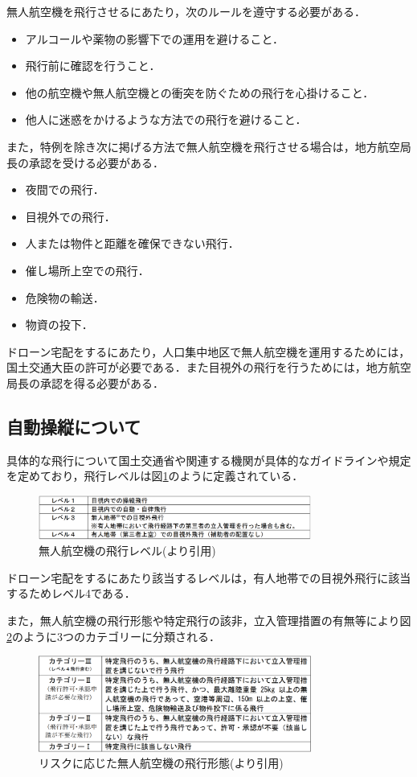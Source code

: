 \documentclass[a4paper, titlepage]{jsarticle}
\begin{document}
無人航空機を飛行させるにあたり，次のルールを遵守する必要がある．\cite{prohibited_guidelines}
\begin{itemize}
  \item アルコールや薬物の影響下での運用を避けること．
  \item 飛行前に確認を行うこと．
  \item 他の航空機や無人航空機との衝突を防ぐための飛行を心掛けること．
  \item 他人に迷惑をかけるような方法での飛行を避けること．
\end{itemize}
また，特例を除き次に掲げる方法で無人航空機を飛行させる場合は，地方航空局長の承認を受ける必要がある．
\begin{itemize}
  \item 夜間での飛行．
  \item 目視外での飛行．
  \item 人または物件と距離を確保できない飛行．
  \item 催し場所上空での飛行．
  \item 危険物の輸送．
  \item 物資の投下．
\end{itemize}

ドローン宅配をするにあたり，人口集中地区で無人航空機を運用するためには，国土交通大臣の許可が必要である．また目視外の飛行を行うためには，地方航空局長の承認を得る必要がある．

\subsection{自動操縦について}
具体的な飛行について国土交通省や関連する機関が具体的なガイドラインや規定を定めており，飛行レベルは図\ref{fig:dron_level}のように定義されている．

\begin{figure}[htbp]
  \centering
  \includegraphics[width=0.8\textwidth]{flying_level.pdf}
  \caption{無人航空機の飛行レベル(\cite{delivery_guidelines_2023}より引用)}
  \label{fig:dron_level}
\end{figure}

ドローン宅配をするにあたり該当するレベルは，有人地帯での目視外飛行に該当するためレベル4である．

また，無人航空機の飛行形態や特定飛行の該非，立入管理措置の有無等により図\ref{fig:dron_category}のように3つのカテゴリーに分類される．
\begin{figure}[htbp]
  \centering
  \includegraphics[width=0.8\textwidth]{dron_category.pdf}
  \caption{リスクに応じた無人航空機の飛行形態(\cite{delivery_guidelines_2023}より引用)}
  \label{fig:dron_category}
\end{figure}
\end{document}
